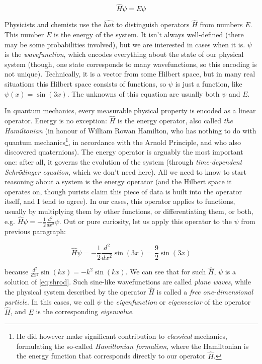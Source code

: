 \documentclass{article}
\begin{document}
\begin{equation} \label{eq:shrod} \hat H \psi = E \psi \end{equation}

Physicists and chemists use the \(\widehat{hat}\) to distinguish operators \(\hat H\) from numbers \(E\). This number \(E\) is the energy of the system. It isn't always well-defined (there may be some probabilities involved), but we are interested in cases when it is. \(\psi\) is the \textit{wavefunction}, which encodes everything about the state of our physical system (though, one state corresponds to many wavefunctions, so this encoding is not unique). Technically, it is a vector from some Hilbert space, but in many real situations this Hilbert space consists of functions, so \(\psi\) is just a function, like \(\psi(x) = \sin(3x)\). The unknowns of this equation are usually both \(\psi\) and \(E\).

In quantum mechanics, every measurable physical property is encoded as a linear operator. Energy is no exception: \(\hat H\) is the energy operator, also called \textit{the Hamiltonian} (in honour of William Rowan Hamilton, who has nothing to do with quantum mechanics\footnote{He did however make significant contribution to \textit{classical} mechanics, formulating the so-called \textit{Hamiltonian formalism}, where the Hamiltonian is the energy function that corresponds directly to our operator \(\hat H\).}, in accordance with the Arnold Principle, and who also discovered quaternions). The energy operator is arguably the most important one: after all, it governs the evolution of the system (through \textit{time-dependent Schrödinger equation}, which we don't need here). All we need to know to start reasoning about a system is the energy operator (and the Hilbert space it operates on, though purists claim this piece of data is built into the operator itself, and I tend to agree). In our cases, this operator applies to functions, usually by multiplying them by other functions, or differentiating them, or both, e.g. \(\hat H \psi = -\frac{1}{2} \frac{d^2}{dx^2}\psi\). Out or pure curiosity, let us apply this operator to the \(\psi\) from previous paragraph:

\begin{equation} \hat H \psi = -\frac{1}{2} \frac{d^2}{dx^2} \sin(3x) = \frac{9}{2} \sin(3x) \end{equation}

because \(\frac{d^2}{dx^2} \sin(kx) = -k^2 \sin(kx)\). We can see that for such \(\hat H\), \(\psi\) is a solution of \eqref{eq:shrod}. Such sine-like wavefunctions are called \textit{plane waves}, while the physical system described by the operator \(\hat H\) is called a \textit{free one-dimensional particle}. In this cases, we call \(\psi\) the \textit{eigenfunction} or \textit{eigenvector} of the operator \(\hat H\), and \(E\) is the corresponding \textit{eigenvalue}.
\end{document}
